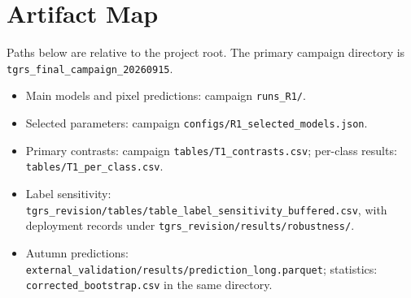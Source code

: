 \documentclass[journal]{IEEEtran}
\begin{document}
\section{Artifact Map}
Paths below are relative to the project root. The primary campaign directory is \texttt{tgrs\_final\_campaign\_20260915}.
\begin{itemize}\raggedright
\item Main models and pixel predictions: campaign \texttt{runs\_R1/}.
\item Selected parameters: campaign \texttt{configs/R1\_selected\_models.json}.
\item Primary contrasts: campaign \texttt{tables/T1\_contrasts.csv}; per-class results: \texttt{tables/T1\_per\_class.csv}.
\item Label sensitivity: \texttt{tgrs\_revision/tables/}\allowbreak\texttt{table\_label\_sensitivity\_buffered.csv}, with deployment records under \texttt{tgrs\_revision/results/robustness/}.
\item Autumn predictions: \texttt{external\_validation/results/}\allowbreak\texttt{prediction\_long.parquet}; statistics: \texttt{corrected\_bootstrap.csv} in the same directory.
\end{itemize}
\onecolumn
\end{document}
